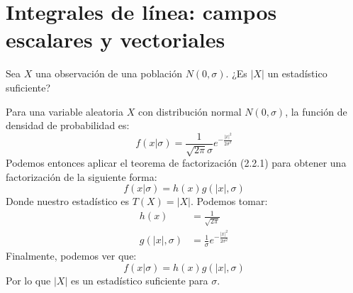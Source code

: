 \section{Integrales de línea: campos escalares y vectoriales}

\begin{ejercicio}[Ejercicio 2.7.1]
    Sea $X$ una observación de una población $N(0, \sigma)$. ¿Es $|X|$ un estadístico suficiente?
\end{ejercicio}

\begin{solucion}
    Para una variable aleatoria $X$ con distribución normal $N(0, \sigma)$, la función de densidad de probabilidad es:
    \begin{equation}
        f(x|\sigma) = \frac{1}{\sqrt{2\pi}\sigma}e^{-\frac{|x|^2}{2\sigma^2}}
    \end{equation}
    Podemos entonces aplicar el teorema de factorización (2.2.1) para obtener una factorización de la siguiente forma:
    \begin{equation}
        f(x|\sigma) = h(x)g(|x|, \sigma)
    \end{equation}
    Donde nuestro estadístico es $T(X) = |X|$. Podemos tomar:
    \begin{align}
        h(x) &= \frac{1}{\sqrt{2\pi}} \\
        g(|x|, \sigma) &= \frac{1}{\sigma} e^{-\frac{|x|^2}{2\sigma^2}}
    \end{align}
    Finalmente, podemos ver que:
    \begin{equation}
        f(x|\sigma) = h(x)g(|x|, \sigma)
    \end{equation}
    Por lo que $|X|$ es un estadístico suficiente para $\sigma$.
\end{solucion}